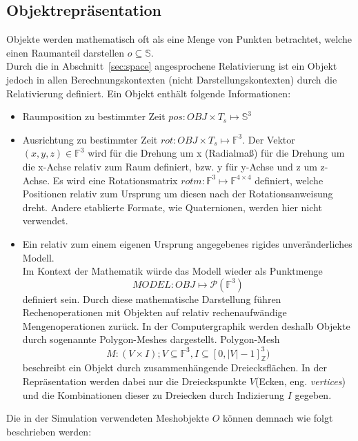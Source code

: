 \subsection{Objektrepräsentation}
\label{sec:objects_rep}
Objekte werden mathematisch oft als eine Menge von Punkten betrachtet, welche einen Raumanteil darstellen $ o \subseteq \mathbb{S}$.\\
Durch die in Abschnitt~\ref{sec:space} angesprochene Relativierung ist ein Objekt jedoch in allen Berechnungskontexten (nicht Darstellungskontexten) durch die Relativierung definiert. Ein Objekt enthält folgende Informationen:
\begin{itemize}
\item Raumposition zu bestimmter Zeit $pos : OBJ \times T_s \mapsto \mathbb{S}^3$
\item Ausrichtung zu bestimmter Zeit $rot : OBJ \times T_s \mapsto \mathbb{F}^3$. Der Vektor $(x, y, z) \in\mathbb{F}^3$ wird für die Drehung um x (Radialmaß) für die Drehung um die x-Achse relativ zum Raum definiert, bzw. y für y-Achse und z um z-Achse. Es wird eine Rotationsmatrix $rotm: \mathbb{F}^3 \mapsto \mathbb{F}^{4\times 4}$ definiert, welche Positionen relativ zum Ursprung um diesen nach der Rotationsanweisung dreht. Andere etablierte Formate, wie Quaternionen, werden hier nicht verwendet.
\item Ein relativ zum einem eigenen Ursprung angegebenes rigides unveränderliches Modell.\\
\sloppy
Im Kontext der Mathematik würde das Modell wieder als Punktmenge $$ MODEL : OBJ \mapsto \mathcal{P}(\mathbb{F}^3) $$ definiert sein.
\fussy
Durch diese mathematische Darstellung führen Rechenoperationen mit Objekten auf relativ rechenaufwändige Mengenoperationen zurück. In der Computergraphik werden deshalb Objekte durch sogenannte Polygon-Meshes dargestellt. 
Polygon-Mesh $$M: (V \times I); V \subseteq \mathbb{F}^3, I \subseteq [0, |V|-1]_\mathbb{Z}^3 )$$ beschreibt ein Objekt durch zusammenhängende Dreiecksflächen. In der Repräsentation werden dabei nur die Dreieckspunkte $V$(Ecken, eng. \textit{vertices}) und die Kombinationen dieser zu Dreiecken durch Indizierung $I$ gegeben.\\

\end{itemize}  
Die in der Simulation verwendeten Meshobjekte $O$ können demnach wie folgt beschrieben werden:

